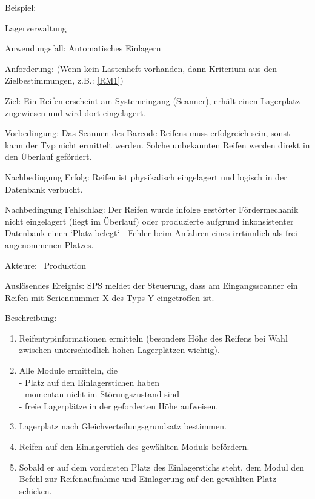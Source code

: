 Beispiel:\\
\begin{function}{10}{Lagerverwaltung}
    \item[Anwendungsfall:] Automatisches Einlagern
    \item[Anforderung:]  (Wenn kein Lastenheft vorhanden, dann Kriterium aus den Zielbestimmungen, z.B.: \ref{RM1})
    \item[Ziel:] Ein Reifen erscheint am Systemeingang (Scanner), erhält einen Lagerplatz
    zugewiesen und wird dort eingelagert.
    \item[Vorbedingung:] Das Scannen des Barcode-Reifens muss erfolgreich sein, sonst kann
    der Typ nicht ermittelt werden. Solche unbekannten Reifen werden direkt in den
    Überlauf gefördert.
    \item[Nachbedingung Erfolg:] Reifen ist physikalisch eingelagert und logisch in der
    Datenbank verbucht.
    \item[Nachbedingung Fehlschlag:] Der Reifen wurde infolge gestörter Fördermechanik
    nicht eingelagert (liegt im Überlauf) oder produzierte aufgrund inkonsistenter
    Datenbank einen `Platz belegt` - Fehler beim Anfahren eines irrtümlich
    als frei angenommenen Platzes.
    \item[Akteure:] ~Produktion
    \item[Auslösendes Ereignis:] SPS meldet der Steuerung, dass am Eingangsscanner ein
    Reifen mit Seriennummer X des Typs Y eingetroffen ist.
    \item[Beschreibung:] ~
    \begin{enumerate}
      \item Reifentypinformationen ermitteln (besonders Höhe des Reifens bei Wahl zwischen unterschiedlich hohen Lagerplätzen wichtig).
      \item Alle Module ermitteln, die\\
    - Platz auf den Einlagerstichen haben\\
    - momentan nicht im Störungszustand sind\\
    -  freie Lagerplätze in der geforderten Höhe aufweisen.
      \item Lagerplatz nach Gleichverteilungsgrundsatz bestimmen.
      \item Reifen auf den Einlagerstich des gewählten Moduls befördern.
      \item Sobald er auf dem vordersten Platz des Einlagerstichs steht, dem Modul den Befehl zur Reifenaufnahme und Einlagerung auf den gewählten Platz schicken.

\end{enumerate}
\end{function}
